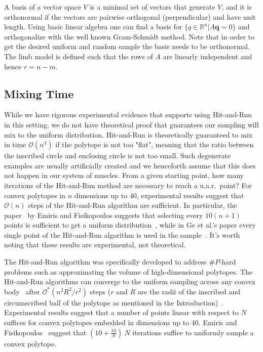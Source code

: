 \documentclass[letterpaper]{article}
\begin{document}
A basis of a vector space $V$ is a minimal set of vectors that generate $V$, and it is orthonormal if the vectors are pairwise orthogonal (perpendicular) and have unit length. Using basic linear algebra one can find a basis for $\{q \in \mathbb{R}^n | A\textbf{q} = 0\}$ and orthogonalize with the well known Gram-Schmidt method. Note that in order to get the desired uniform and random sample the basis needs to be orthonormal. The limb model is defined such that the rows of $A$ are linearly independent and hence $r=n-m$.

\subsection*{Mixing Time}
\label{sec_lengthrun}
While we have rigorous experimental evidence that supports using Hit-and-Run in this setting, we do not have theoretical proof that guarantees our sampling will mix to the uniform distribution. Hit-and-Run is theoretically guaranteed to mix in time $\mathcal{O}(n^3)$ if the polytope is not too "flat", meaning that the ratio between the inscribed circle and enclosing circle is not too small. Such degenerate examples are usually artificially created and we henceforth assume that this does not happen in our system of muscles.
From a given starting point, how many iterations of the Hit-and-Run method are necessary to reach a u.a.r.\ point?
For convex polytopes in $n$ dimensions up to $40$, experimental results suggest that $\mathcal{O}(n)$ steps of the Hit-and-Run algorithm are sufficient.
In particular, the paper~\cite{emiris2013efficient} by Emiris and Fisikopoulos suggests that selecting every $10(n + 1)$ points is sufficient to get a uniform distribution~\cite{emiris2013efficient}, while in Ge et al.'s paper every single point of the Hit-and-Run algorithm is used in the sample~\cite{Ge}. It's worth noting that these results are experimental, not theoretical.


The Hit-and-Run algorithm was specifically developed to address $\#P$-hard problems such as approximating the volume of high-dimensional polytopes\cite{Dyer}. The Hit-and-Run algorithms can converge to the uniform sampling across any convex body~\cite{smith1984efficient} after $\mathcal{O}^*(n^2R^2/r^2)$ steps ($r$ and $R$ are the radii of the inscribed and circumscribed ball of the polytope as mentioned in the Introduction)~\cite{Dyer, Lovasz}. Experimental results suggest that a number of points linear with respect to $N$ suffices for convex polytopes embedded in dimensions up to 40. Emiris and Fisikopoulos~\cite{emiris2013efficient} suggest that $(10 + \frac{10}{N})~N$ iterations suffice to uniformly sample a convex polytope.
\end{document}
